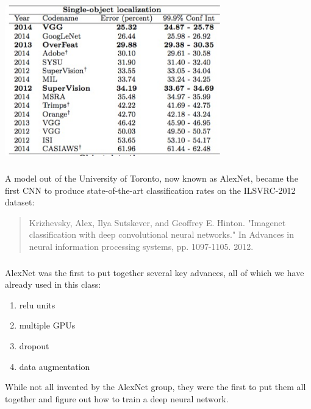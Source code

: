 \documentclass[xetex,mathserif,serif,aspectratio=169]{beamer}
\begin{document}
\begin{frame}[fragile] \frametitle{} \oldB \small

\begin{center}
\includegraphics[width=0.7\textwidth]{img/ilsvrcLocalRates.jpg}
\end{center}

\end{frame}

\begin{frame}[fragile] \frametitle{} \oldB \small


A model out of the University of Toronto, now known as AlexNet,
became the first CNN to produce state-of-the-art classification
rates on the ILSVRC-2012 dataset:
\begin{quote}
Krizhevsky, Alex, Ilya Sutskever, and Geoffrey E. Hinton. "Imagenet classification with deep convolutional neural networks." In Advances in neural information processing systems, pp. 1097-1105. 2012.
\end{quote}

\end{frame}

\begin{frame}[fragile] \frametitle{} \oldB \small


AlexNet was the first to put together several key advances, all
of which we have already used in this class:
\begin{enumerate}
\item relu units
\item multiple GPUs
\item dropout
\item data augmentation
\end{enumerate}
While not all invented by the AlexNet group, they were the first
to put them all together and figure out how to train a deep
neural network.

\end{frame}
\end{document}
